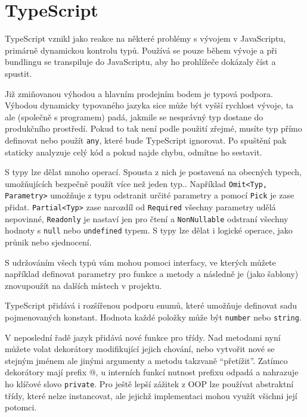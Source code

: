 \section{TypeScript}

TypeScript vznikl jako reakce na některé problémy s vývojem v JavaScriptu, primárně dynamickou kontrolu typů. Používá se pouze během vývoje a při bundlingu se transpiluje do JavaScriptu, aby ho prohlížeče dokázaly číst a spustit.

Již zmiňovanou výhodou a hlavním prodejním bodem je typová podpora. Výhodou dynamicky typovaného jazyka sice může být vyšší rychlost vývoje, ta ale (společně s programem) padá, jakmile se nesprávný typ dostane do produkčního prostředí. Pokud to tak není podle použití zřejmé, musíte typ přímo definovat nebo použít \texttt{any}, které bude TypeScript ignorovat. Po spuštění pak staticky analyzuje celý kód a pokud najde chybu, odmítne ho sestavit.

S typy lze dělat mnoho operací. Spousta z nich je postavená na obecných typech, umožňujících bezpečně použít více než jeden typ.\cite{TSGenerics}. Například \texttt{Omit<Typ, Parametry>} umožňuje z typu odstranit určité parametry a pomocí \texttt{Pick} je zase přidat. \texttt{Partial<Typ>} zase narozdíl od \texttt{Required} všechny parametry udělá nepovinné, \texttt{Readonly} je nastaví jen pro čtení a \texttt{NonNullable} odstraní všechny hodnoty s \texttt{null} nebo \texttt{undefined} typem. S typy lze dělat i logické operace, jako průnik nebo sjednocení.

S udržováním všech typů vám mohou pomoci interfacy, ve kterých můžete například definovat parametry pro funkce a metody a následně je (jako šablony) znovupoužít na dalších místech v projektu.

TypeScript přidává i rozšířenou podporu enumů, které umožňuje definovat sadu pojmenovaných konstant. Hodnota každé položky může být \texttt{number} nebo \texttt{string}.\cite{WhatIsAnEnum}

V neposlední řadě jazyk přidává nové funkce pro třídy. Nad metodami nyní můžete volat dekorátory modifikující jejich chování, nebo vytvořit nové se stejným jménem ale jinými argumenty a metodu takzvaně \enquote{přetížit}. Zatímco dekorátory mají prefix @, u interních funkcí nutnost prefixu odpadá a nahrazuje ho klíčové slovo \texttt{private}. Pro ještě lepší zážitek z OOP lze používat abstraktní třídy, které nelze instancovat, ale jejichž implementaci mohou využít všichni její potomci.